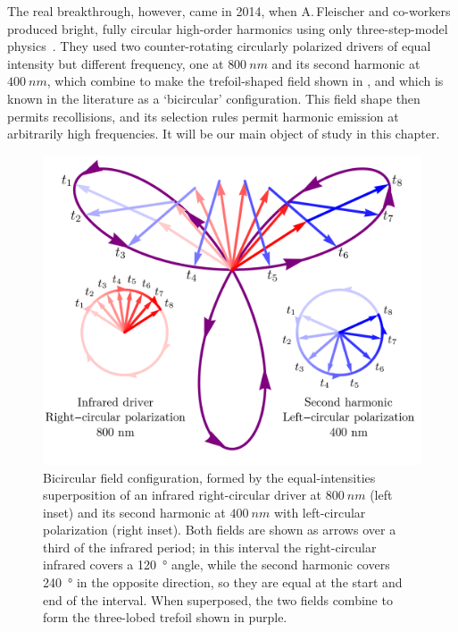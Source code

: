 The real breakthrough, however, came in 2014, when A.\,Fleischer and co-workers produced bright, fully circular high-order harmonics using only three-step-model physics~\cite{fleischer_spin_2014}. They used two counter-rotating circularly polarized drivers of equal intensity but different frequency, one at $\SI{800}{nm}$ and its second harmonic at $\SI{400}{nm}$, which combine to make the trefoil-shaped field shown in , and which is known in the literature as a `bicircular' configuration. This field shape then permits recollisions, and its selection rules permit harmonic emission at arbitrarily high frequencies. It will be our main object of study in this chapter.


\begin{figure}[htb]
  \centering
  \includegraphics[scale=1]{8-Spin-HHG/Figures/figure8A.png}
  \caption[
  Bicircular field configuration: a right-circular $\SI{800}{nm}$ field combines with a left-circular $\SI{400}{nm}$ one to make a trefoil-shaped total field
  ]{
  Bicircular field configuration, formed by the equal-intensities superposition of an infrared right-circular driver at $\SI{800}{nm}$ (left inset) and its second harmonic at $\SI{400}{nm}$ with left-circular polarization (right inset). Both fields are shown as arrows over a third of the infrared period; in this interval the right-circular infrared covers a \SI{120}{\degree} angle, while the second harmonic covers \SI{240}{\degree} in the opposite direction, so they are equal at the start and end of the interval. When superposed, the two fields combine to form the three-lobed trefoil shown in purple.
  }
  \label{f8-bicircular-field-sketch}
\end{figure}

